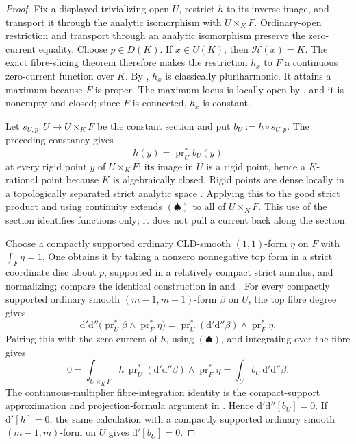 \begin{proof}
Fix a displayed trivializing open \(U\), restrict \(h\) to its inverse
image, and transport it through the analytic isomorphism with
\(U\times_KF\).  Ordinary-open restriction and transport through an
analytic isomorphism preserve the zero-current equality.  Choose
\(p\in D(K)\).  If
\(x\in U(K)\), then \(\mathscr H(x)=K\).  The exact fibre-slicing theorem
 therefore makes
the restriction \(h_x\) to \(F\) a continuous zero-current function over
\(K\).  By , \(h_x\) is
classically pluriharmonic.  It attains a maximum because \(F\) is proper.
The maximum locus is locally open by
, and it is nonempty and closed; since
\(F\) is connected, \(h_x\) is constant.

Let \(s_{U,p}:U\to U\times_KF\) be the constant section and put
\(b_U:=h\circ s_{U,p}\).  The preceding constancy gives
\[
                    h(y)=\operatorname{pr}_U^*b_U(y)
                    \tag{\(\spadesuit\)}
\]
at every rigid point \(y\) of \(U\times_KF\): its image in \(U\) is a
rigid point, hence a \(K\)-rational point because \(K\) is algebraically
closed.  Rigid points are dense locally in a topologically separated strict
analytic space \cite[Proposition~2.1.15]{Berk12}.  Applying this to the
good strict product and using continuity extends \((\spadesuit)\) to all
of \(U\times_KF\).  This use of the section identifies functions only; it
does not pull a current back along the section.

Choose a compactly supported ordinary CLD-smooth \((1,1)\)-form \(\eta\)
on \(F\) with \(\int_F\eta=1\).  One obtains it by taking a nonzero
nonnegative top form in a strict coordinate disc about \(p\), supported in
a relatively compact strict annulus, and normalizing; compare the identical
construction in  and
\cite[Proposition~11.1 and Example~11.7]{GJR26}.  For every compactly
supported ordinary smooth \((m-1,m-1)\)-form \(\beta\) on \(U\), the
top fibre degree gives
\[
 \mathrm d'\mathrm d''\bigl(\operatorname{pr}_U^*\beta
       \wedge\operatorname{pr}_F^*\eta\bigr)
   =\operatorname{pr}_U^*(\mathrm d'\mathrm d''\beta)
       \wedge\operatorname{pr}_F^*\eta.
\]
Pairing this with the zero current of \(h\), using \((\spadesuit)\), and
integrating over the fibre gives
\[
 0=\int_{U\times_KF}h\,
       \operatorname{pr}_U^*(\mathrm d'\mathrm d''\beta)
       \wedge\operatorname{pr}_F^*\eta
   =\int_U b_U\,\mathrm d'\mathrm d''\beta.
\]
The continuous-multiplier fibre-integration identity is the compact-support
approximation and projection-formula argument in
.  Hence
\(\mathrm d'\mathrm d''[b_U]=0\).  If \(\mathrm d'[h]=0\), the same
calculation with a compactly supported ordinary smooth \((m-1,m)\)-form
on \(U\) gives \(\mathrm d'[b_U]=0\).


\end{proof}
